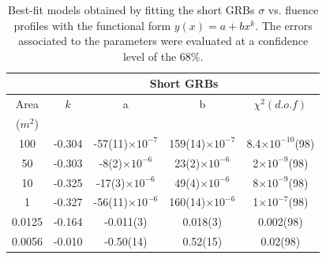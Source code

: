 \documentclass[]{spie}  %
\begin{document}
\begin{table}

\footnotesize
\centering
\begin{tabular}{|c|c|c|c|c|}
\hline
\multicolumn{1}{|c|}{    } & \multicolumn{4}{c|}{\textbf{Short GRBs}}  \\
\hline
Area & $k$ & a & b & $\chi^2 (d.o.f)$  \\
($m^2$) &  &  &  &   \\

\hline
100 & -0.304 & -57(11)$\times10^{-7}$ & 159(14)$\times10^{-7}$ & 8.4$\times10^{-10}$(98) \\
50 & -0.303 & -8(2)$\times10^{-6}$ & 23(2)$\times10^{-6}$ & 2$\times10^{-9}$(98) \\
10 & -0.325 & -17(3)$\times10^{-6}$ & 49(4)$\times10^{-6}$ & 8$\times10^{-9}$(98) \\
1 & -0.327 & -56(11)$\times10^{-6}$ & 160(14)$\times10^{-6}$ & 1$\times10^{-7}$(98) \\
0.0125 & -0.164 & -0.011(3) & 0.018(3) & 0.002(98) \\
0.0056 & -0.010 & -0.50(14) & 0.52(15) & 0.02(98) \\
\hline
\end{tabular}
\label{tab:fit_sigma_Short}
\caption{Best-fit models obtained by fitting the short GRBs $\sigma$ vs. fluence profiles with the functional form $y(x)=a+bx^k$. The errors associated to the parameters were evaluated at a confidence level of the 68\%.}
\end{table}
\end{document}

